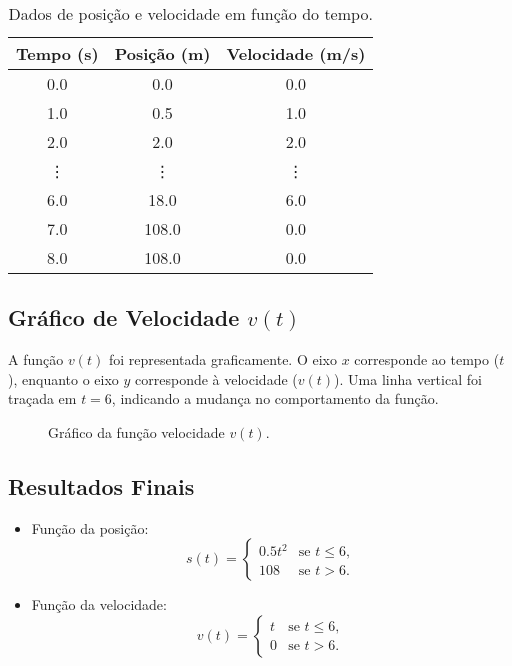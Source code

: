 \begin{table}[H]
    \centering
    \begin{tabular}{|c|c|c|}
        \hline
        \textbf{Tempo (s)} & \textbf{Posição (m)} & \textbf{Velocidade (m/s)} \\
        \hline
        0.0 & 0.0 & 0.0 \\
        1.0 & 0.5 & 1.0 \\
        2.0 & 2.0 & 2.0 \\
        \vdots & \vdots & \vdots \\
        6.0 & 18.0 & 6.0 \\
        7.0 & 108.0 & 0.0 \\
        8.0 & 108.0 & 0.0 \\
        \hline
    \end{tabular}
    \caption{Dados de posição e velocidade em função do tempo.}
\end{table}

\subsection*{Gráfico de Velocidade \(v(t)\)}
A função \(v(t)\) foi representada graficamente. O eixo \(x\) corresponde ao tempo (\(t\)), enquanto o eixo \(y\) corresponde à velocidade (\(v(t)\)). Uma linha vertical foi traçada em \(t = 6\), indicando a mudança no comportamento da função.

\begin{figure}[H]
    \centering
    \caption{Gráfico da função velocidade \(v(t)\).}\label{fig:figure}
\end{figure}

\subsection*{Resultados Finais}
\begin{itemize}
    \item Função da posição:
    \[
    s(t) = 
    \begin{cases} 
    0.5t^2 & \text{se } t \leq 6, \\
    108 & \text{se } t > 6.
    \end{cases}
    \]
    \item Função da velocidade:
    \[
    v(t) = 
    \begin{cases} 
    t & \text{se } t \leq 6, \\
    0 & \text{se } t > 6.
    \end{cases}
    \]
\end{itemize}
